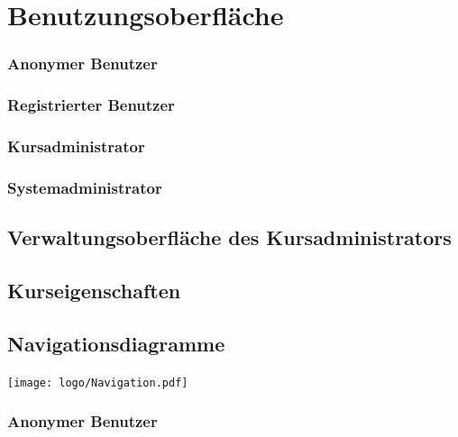 \documentclass[a4paper]{scrreprt}
\begin{document}
		
 
\chapter{Benutzungsoberfläche}
    
    
    \subsection{Anonymer Benutzer}
       	
       	
       	
    \subsection{Registrierter Benutzer}
       
       	
       	    
    \subsection{Kursadministrator}
        
        

    \subsection{Systemadministrator}
        
        
            
   
    
    \section{Verwaltungsoberfläche des Kursadministrators}
    
   
       
    
    \section{Kurseigenschaften}
    
    
       
    
    
    \section{Navigationsdiagramme}
   \texttt{[image: logo/Navigation.pdf]}
        \subsection{Anonymer Benutzer}
            
\end{document}
